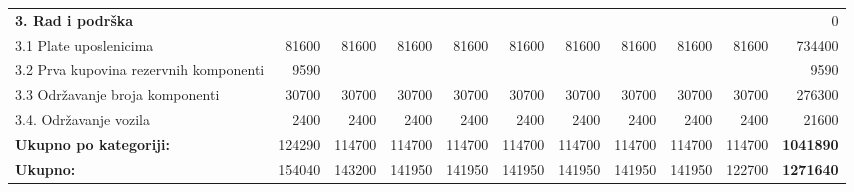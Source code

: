 \documentclass[12pt]{article}
\begin{document}
\begin{landscape}
\begin{table}[htbp]
\begin{tabular}{lrrrrrrrrrr}
    \midrule
    \textbf{3. Rad i podrška} &       &       &       &       &       &       &       &       &       & 0 \\
    3.1 Plate uposlenicima & 81600 & 81600 & 81600 & 81600 & 81600 & 81600 & 81600 & 81600 & 81600 & 734400 \\
    \multicolumn{1}{p{14.715em}}{3.2 Prva kupovina rezervnih\newline{} komponenti} & 9590  &       &       &       &       &       &       &       &       & 9590 \\
    3.3 Održavanje broja komponenti & 30700 & 30700 & 30700 & 30700 & 30700 & 30700 & 30700 & 30700 & 30700 & 276300 \\
    3.4. Održavanje vozila & 2400  & 2400  & 2400  & 2400  & 2400  & 2400  & 2400  & 2400  & 2400  & 21600 \\
    \midrule
    \textbf{Ukupno po kategoriji:} & 124290 & 114700 & 114700 & 114700 & 114700 & 114700 & 114700 & 114700 & 114700 & \textbf{1041890} \\
    \midrule
    \textbf{Ukupno:} & 154040 & 143200 & 141950 & 141950 & 141950 & 141950 & 141950 & 141950 & 122700 & \textbf{1271640} \\

    \bottomrule
    \end{tabular}%
  \label{rj3_50}%
\end{table}%

\end{landscape}
\end{document}
